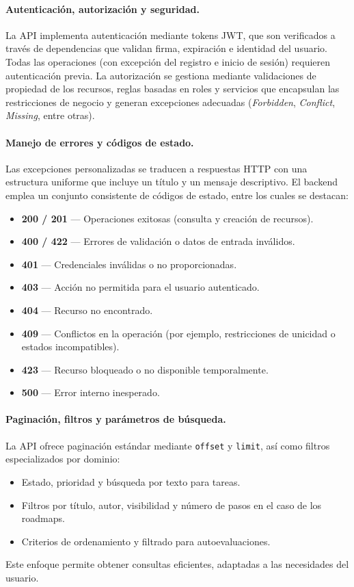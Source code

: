 \paragraph{Autenticación, autorización y seguridad.}
La API implementa autenticación mediante tokens JWT, que son verificados a través de
dependencias que validan firma, expiración e identidad del usuario. Todas las operaciones (con
excepción del registro e inicio de sesión) requieren autenticación previa. La autorización se
gestiona mediante validaciones de propiedad de los recursos, reglas basadas en roles y servicios que
encapsulan las restricciones de negocio y generan excepciones adecuadas (\textit{Forbidden},
\textit{Conflict}, \textit{Missing}, entre otras).

\paragraph{Manejo de errores y códigos de estado.}
Las excepciones personalizadas se traducen a respuestas HTTP con una estructura uniforme que
incluye un título y un mensaje descriptivo. El backend emplea un conjunto consistente de códigos
de estado, entre los cuales se destacan:

\begin{itemize}
    \item \textbf{200 / 201} — Operaciones exitosas (consulta y creación de recursos).
    \item \textbf{400 / 422} — Errores de validación o datos de entrada inválidos.
    \item \textbf{401} — Credenciales inválidas o no proporcionadas.
    \item \textbf{403} — Acción no permitida para el usuario autenticado.
    \item \textbf{404} — Recurso no encontrado.
    \item \textbf{409} — Conflictos en la operación (por ejemplo, restricciones de unicidad o estados incompatibles).
    \item \textbf{423} — Recurso bloqueado o no disponible temporalmente.
    \item \textbf{500} — Error interno inesperado.
\end{itemize}

\paragraph{Paginación, filtros y parámetros de búsqueda.}
La API ofrece paginación estándar mediante \texttt{offset} y \texttt{limit}, así como filtros
especializados por dominio:
\begin{itemize}
    \item Estado, prioridad y búsqueda por texto para tareas.
    \item Filtros por título, autor, visibilidad y número de pasos en el caso de los roadmaps.
    \item Criterios de ordenamiento y filtrado para autoevaluaciones.
\end{itemize}
Este enfoque permite obtener consultas eficientes, adaptadas a las necesidades del usuario.


